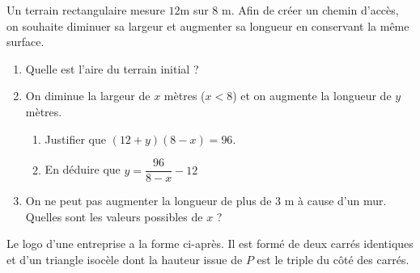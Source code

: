 {\begin{Exercice}
\end{Exercice}

\newpage

\begin{Exercice}
Un terrain rectangulaire mesure $12$m sur $8$ m. Afin de créer un chemin d'accès, on souhaite diminuer sa largeur et augmenter sa longueur en conservant la même surface.
\begin{enumerate}
	\item Quelle est l'aire du terrain initial ?
	\item On diminue la largeur de $x$ mètres ($x<8$) et on augmente la longueur de $y$ mètres.
	\begin{enumerate} 
		\item Justifier que $(12+y)(8-x)=96$.
		\item En déduire que $y=\dfrac{96}{8-x}-12$
\end{enumerate}
	\item On ne peut pas augmenter la longueur de plus de 3 m à cause d'un mur. \\Quelles sont les valeurs possibles de $x$ ?
\end{enumerate}
\end{Exercice}

\begin{Exercice} %

Le logo d'une entreprise a la forme ci-après. Il est formé de deux carrés identiques et d'un triangle isocèle dont la hauteur issue de $P$ est le triple du côté des carrés.
\begin{center}
\end{center}
\end{Exercice}}
